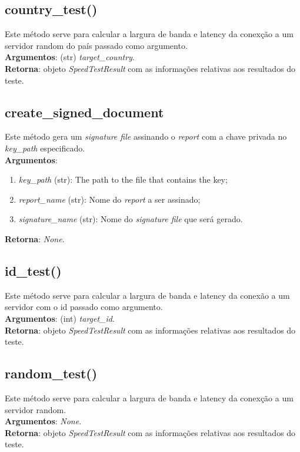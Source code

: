 \documentclass{report}
\begin{document}
\subsection{country\_test()}
\label{subsec.countrytest}
\hspace{5mm}Este método serve para calcular a largura de banda e latency da conexção a um servidor random do país passado como argumento.\\ 
\hspace{5mm}\textbf{Argumentos}: (str) \textit{target\_country}.\\
\textbf{Retorna}: objeto \textit{SpeedTestResult} com as informações relativas aos resultados do teste.

\subsection{create\_signed\_document}
\label{subsec.signDoc}
\hspace{5mm}Este método gera um \textit{signature file} assinando o \textit{report} com a chave privada no \textit{key\_path} especificado.\\ 
\hspace{5mm}\textbf{Argumentos}: 
\begin{enumerate}
\item \textit{key\_path} (str): The path to the file that contains the key;
\item \textit{report\_name} (str): Nome do \textit{report} a ser assinado;
\item \textit{signature\_name} (str): Nome do \textit{signature file} que será gerado.	
\end{enumerate}
\textbf{Retorna}: \textit{None}.

\subsection{id\_test()}
\hspace{5mm}Este método serve para calcular a largura de banda e latency da conexão a um servidor com o id passado como argumento.\\ 
\hspace{5mm}\textbf{Argumentos}: (int) \textit{target\_id}.\\
\textbf{Retorna}: objeto \textit{SpeedTestResult} com as informações relativas aos resultados do teste.

\subsection{random\_test()}
\label{subsec.randt}
Este método serve para calcular a largura de banda e latency da conexção a um servidor random.\\ 
\textbf{Argumentos}: \textit{None}.\\
\textbf{Retorna}: objeto \textit{SpeedTestResult} com as informações relativas aos resultados do teste.
\end{document}

